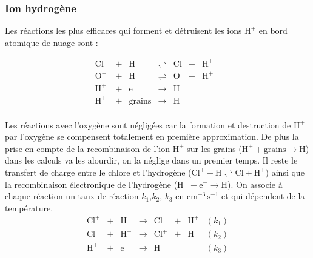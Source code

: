 \subsubsection{Ion hydrogène}

Les réactions les plus efficaces qui forment et détruisent les ions $\mathrm{H}^+$ en bord atomique de nuage sont :

\begin{equation}\label{eq:sysH}
    \begin{array}{lllllllr}
        \mathrm{Cl}^+ & + &\mathrm{H}   & \rightleftharpoons &\mathrm{Cl}  & + & \mathrm{H}^+ &   \\
        \mathrm{O}^+ & + &\mathrm{H}   & \rightleftharpoons &\mathrm{O}  & + & \mathrm{H}^+ &   \\
        \mathrm{H}^+  & + & \mathrm{e}^-  & \rightarrow &\mathrm{H}   &   &  &  \\
        \mathrm{H}^+  & + & \mathrm{grains}  & \rightarrow &\mathrm{H}   &   &  &  \\
    \end{array}
\end{equation}

Les réactions avec l'oxygène sont négligées car la formation et destruction de $\mathrm{H}^+$ par l'oxygène se compensent totalement en première approximation. De plus la prise en compte de la recombinaison de l'ion $\mathrm{H}^+$ sur les grains ($\mathrm{H}^+  + \mathrm{grains}  \rightarrow \mathrm{H}$) dans les calculs va les alourdir, on la néglige dans un premier temps. Il reste le transfert de charge entre le chlore et l'hydrogène ($\mathrm{Cl}^+  + \mathrm{H}    \rightleftharpoons \mathrm{Cl}   +  \mathrm{H}^+$) ainsi que la recombinaison électronique de l'hydrogène ($\mathrm{H}^+  + \mathrm{e}^-  \rightarrow\mathrm{H}$). On associe à chaque réaction un taux de réaction $k_1$,$k_2$, $k_3$ en $\mathrm{cm}^{-3}\,\mathrm{s}^{-1}$ et qui dépendent de la température.  
\begin{equation}
    \begin{array}{lllllllr}
        \mathrm{Cl}^+ & + &\mathrm{H}   & \rightarrow &\mathrm{Cl}  & + & \mathrm{H}^+ & (k_1) \\
        \mathrm{Cl}  & + & \mathrm{H}^+  & \rightarrow & \mathrm{Cl}^+ & + &\mathrm{H}  & (k_2) \\
        \mathrm{H}^+  & + & \mathrm{e}^-  & \rightarrow &\mathrm{H}   &   &     & (k_3) \\
    \end{array}
\end{equation}

